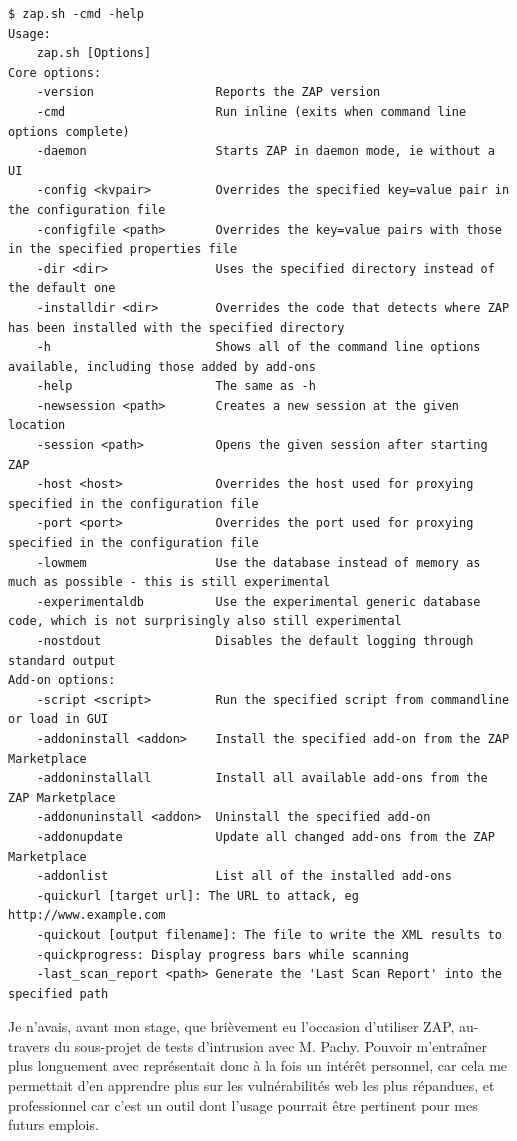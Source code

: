 \begin{lstlisting}[caption={Options de ZAP en ligne de commande},frame=single]
$ zap.sh -cmd -help
Usage:
    zap.sh [Options]
Core options:
    -version                 Reports the ZAP version
    -cmd                     Run inline (exits when command line options complete)
    -daemon                  Starts ZAP in daemon mode, ie without a UI
    -config <kvpair>         Overrides the specified key=value pair in the configuration file
    -configfile <path>       Overrides the key=value pairs with those in the specified properties file
    -dir <dir>               Uses the specified directory instead of the default one
    -installdir <dir>        Overrides the code that detects where ZAP has been installed with the specified directory
    -h                       Shows all of the command line options available, including those added by add-ons
    -help                    The same as -h
    -newsession <path>       Creates a new session at the given location
    -session <path>          Opens the given session after starting ZAP
    -host <host>             Overrides the host used for proxying specified in the configuration file
    -port <port>             Overrides the port used for proxying specified in the configuration file
    -lowmem                  Use the database instead of memory as much as possible - this is still experimental
    -experimentaldb          Use the experimental generic database code, which is not surprisingly also still experimental
    -nostdout                Disables the default logging through standard output
Add-on options:
    -script <script>         Run the specified script from commandline or load in GUI
    -addoninstall <addon>    Install the specified add-on from the ZAP Marketplace
    -addoninstallall         Install all available add-ons from the ZAP Marketplace
    -addonuninstall <addon>  Uninstall the specified add-on
    -addonupdate             Update all changed add-ons from the ZAP Marketplace
    -addonlist               List all of the installed add-ons
    -quickurl [target url]: The URL to attack, eg http://www.example.com
    -quickout [output filename]: The file to write the XML results to
    -quickprogress: Display progress bars while scanning
    -last_scan_report <path> Generate the 'Last Scan Report' into the specified path
\end{lstlisting}

Je n'avais, avant mon stage, que brièvement eu l'occasion d'utiliser ZAP, au-travers du sous-projet de tests d'intrusion avec M. Pachy. Pouvoir m'entraîner plus longuement avec représentait donc à la fois un intérêt personnel, car cela me permettait d'en apprendre plus sur les vulnérabilités web les plus répandues, et professionnel car c'est un outil dont l'usage pourrait être pertinent pour mes futurs emplois.

